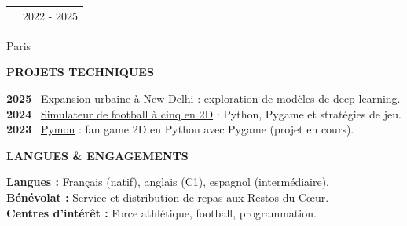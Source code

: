 \documentclass[10pt,a4paper]{extarticle}
\makeatletter
\newcommand{\cvsection}[1]{%
  \vspace{9pt}
  {\fontsize{10.5}{12.5}\selectfont\bfseries\color{CVAccent}\MakeUppercase{#1}}\par
  \vspace{3pt}{\color{CVGray!35}\hrule height .45pt}\vspace{4pt}}
\newcommand{\cvrole}[3]{%
  \begin{tabularx}{\linewidth}{@{}>{\raggedright\arraybackslash}X r@{}}
  {\bfseries #1} & {\fontsize{9}{11}\selectfont\color{CVGray}#2}
  \end{tabularx}\par
  {\fontsize{9}{11}\selectfont\color{CVGray}#3}\par\vspace{2pt}}
\makeatother
\begin{document}
\cvrole{Classes préparatoires (CPGE MP2I / MPI) | Lycée Janson-de-Sailly}{2022 - 2025}{Paris}

\cvsection{PROJETS TECHNIQUES}

\textbf{2025} \textbar\ \href{https://github.com/nathan-robert/prediction-of-the-urbanization-of-New-Delhi}{Expansion urbaine à New Delhi} : exploration de modèles de deep learning.\\[1.6pt]
\textbf{2024} \textbar\ \href{https://github.com/nathan-robert/Football-Match-simulation}{Simulateur de football à cinq en 2D} : Python, Pygame et stratégies de jeu.\\[1.6pt]
\textbf{2023} \textbar\ \href{https://github.com/nathan-robert/Pymon}{Pymon} : fan game 2D en Python avec Pygame (projet en cours).

\cvsection{LANGUES \& ENGAGEMENTS}

\textbf{Langues :} Français (natif), anglais (C1), espagnol (intermédiaire).\\[1.6pt]
\textbf{Bénévolat :} Service et distribution de repas aux Restos du Cœur.\\[1.6pt]
\textbf{Centres d'intérêt :} Force athlétique, football, programmation.
\end{document}
